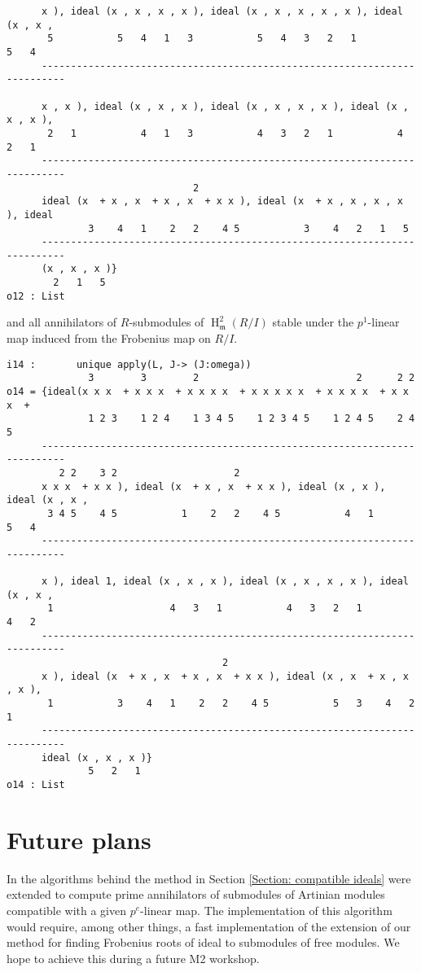 \documentclass[11pt]{amsart}
\DeclareMathOperator{\HH}{H}
\begin{document}
\begin{example}
\begin{verbatim}
      x ), ideal (x , x , x , x ), ideal (x , x , x , x , x ), ideal (x , x ,
       5           5   4   1   3           5   4   3   2   1           5   4
      --------------------------------------------------------------------------

      x , x ), ideal (x , x , x ), ideal (x , x , x , x ), ideal (x , x , x ),
       2   1           4   1   3           4   3   2   1           4   2   1
      --------------------------------------------------------------------------
                                2
      ideal (x  + x , x  + x , x  + x x ), ideal (x  + x , x , x , x ), ideal
              3    4   1    2   2    4 5           3    4   2   1   5
      --------------------------------------------------------------------------
      (x , x , x )}
        2   1   5
o12 : List
\end{verbatim}
and all annihilators of $R$-submodules of $\HH^2_{\mathfrak{m}} (R/I)$ stable under the $p^1$-linear map induced from the Frobenius map on $R/I$.
\begin{verbatim}
i14 :       unique apply(L, J-> (J:omega))
              3        3        2                           2      2 2
o14 = {ideal(x x x  + x x x  + x x x x  + x x x x x  + x x x x  + x x x  +
              1 2 3    1 2 4    1 3 4 5    1 2 3 4 5    1 2 4 5    2 4 5
      --------------------------------------------------------------------------
         2 2    3 2                    2
      x x x  + x x ), ideal (x  + x , x  + x x ), ideal (x , x ), ideal (x , x ,
       3 4 5    4 5           1    2   2    4 5           4   1           5   4
      --------------------------------------------------------------------------

      x ), ideal 1, ideal (x , x , x ), ideal (x , x , x , x ), ideal (x , x ,
       1                    4   3   1           4   3   2   1           4   2
      --------------------------------------------------------------------------
                                     2
      x ), ideal (x  + x , x  + x , x  + x x ), ideal (x , x  + x , x , x ),
       1           3    4   1    2   2    4 5           5   3    4   2   1
      --------------------------------------------------------------------------
      ideal (x , x , x )}
              5   2   1
o14 : List
\end{verbatim}

\end{example}

\section{Future plans}

In \cite{KatzmanZhangAlgorithm} the algorithms behind the method in Section \ref{Section: compatible ideals} were extended
to compute prime annihilators of submodules of Artinian modules compatible with a given $p^{e}$-linear map. The implementation of this algorithm
would require, among other things, a fast implementation of the extension of our method for finding Frobenius roots of ideal to submodules of free modules.
We hope to achieve this during a future M2 workshop.




\end{document}
